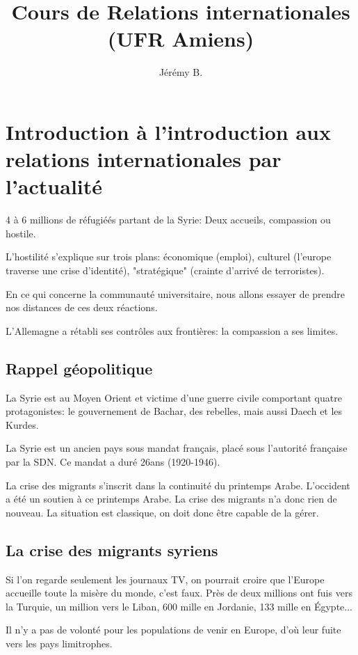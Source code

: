﻿\documentclass[12pt, a4paper, openany]{book}
\author{Jérémy B.}
\date{}
\title{Cours de Relations internationales (UFR Amiens)}
\begin{document}
\maketitle

\chapter{Introduction à l'introduction aux relations internationales par l'actualité}
4 à 6 millions de réfugiéés partant de la Syrie:
Deux accueils, compassion ou hostile.

L'hostilité s'explique sur trois plans: économique (emploi), culturel (l'europe traverse une crise d'identité), "stratégique" (crainte d'arrivé de terroristes).

En ce qui concerne la communauté universitaire, nous allons essayer de prendre nos distances de ces deux réactions.

L'Allemagne a rétabli ses contrôles aux frontières: la compassion a ses limites.

\section{Rappel géopolitique}

La Syrie est au Moyen Orient et victime d'une guerre civile comportant quatre protagonistes: le gouvernement de Bachar, des rebelles, mais aussi Daech et les Kurdes.

La Syrie est un ancien pays sous mandat français, placé sous l'autorité française par la SDN. Ce mandat a duré 26ans (1920-1946). 

La crise des migrants s'inscrit dans la continuité du printemps Arabe. L'occident a été un soutien à ce printemps Arabe. La crise des migrants n'a donc rien de nouveau. La situation est classique, on doit donc être capable de la gérer.

\section{La crise des migrants syriens}

Si l'on regarde seulement les journaux TV, on pourrait croire que l'Europe accueille toute la misère du monde, c'est faux. Près de deux millions ont fuis vers la Turquie, un million vers le Liban, 600 mille en Jordanie, 133 mille en Égypte...

Il n'y a pas de volonté pour les populations de venir en Europe, d'où leur fuite vers les pays limitrophes.
\end{document}
